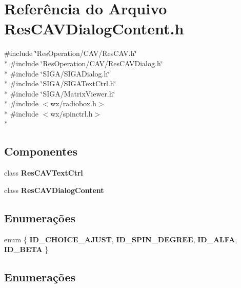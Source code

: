 \section{Referência do Arquivo Res\+C\+A\+V\+Dialog\+Content.\+h}
\label{_c_a_v_2_res_c_a_v_dialog_content_8h}
{\ttfamily \#include \char`\"{}Res\+Operation/\+C\+A\+V/\+Res\+C\+A\+V.\+h\char`\"{}}\\*
{\ttfamily \#include \char`\"{}Res\+Operation/\+C\+A\+V/\+Res\+C\+A\+V\+Dialog.\+h\char`\"{}}\\*
{\ttfamily \#include \char`\"{}S\+I\+G\+A/\+S\+I\+G\+A\+Dialog.\+h\char`\"{}}\\*
{\ttfamily \#include \char`\"{}S\+I\+G\+A/\+S\+I\+G\+A\+Text\+Ctrl.\+h\char`\"{}}\\*
{\ttfamily \#include \char`\"{}S\+I\+G\+A/\+Matrix\+Viewer.\+h\char`\"{}}\\*
{\ttfamily \#include $<$wx/radiobox.\+h$>$}\\*
{\ttfamily \#include $<$wx/spinctrl.\+h$>$}\\*
\subsection*{Componentes}
\begin{DoxyCompactItemize}
\item 
class {\bf Res\+C\+A\+V\+Text\+Ctrl}
\item 
class {\bf Res\+C\+A\+V\+Dialog\+Content}
\end{DoxyCompactItemize}
\subsection*{Enumerações}
\begin{DoxyCompactItemize}
\item 
enum \{ {\bf I\+D\+\_\+\+C\+H\+O\+I\+C\+E\+\_\+\+A\+J\+U\+ST}, 
{\bf I\+D\+\_\+\+S\+P\+I\+N\+\_\+\+D\+E\+G\+R\+EE}, 
{\bf I\+D\+\_\+\+A\+L\+FA}, 
{\bf I\+D\+\_\+\+B\+E\+TA}
 \}
\end{DoxyCompactItemize}


\subsection{Enumerações}
